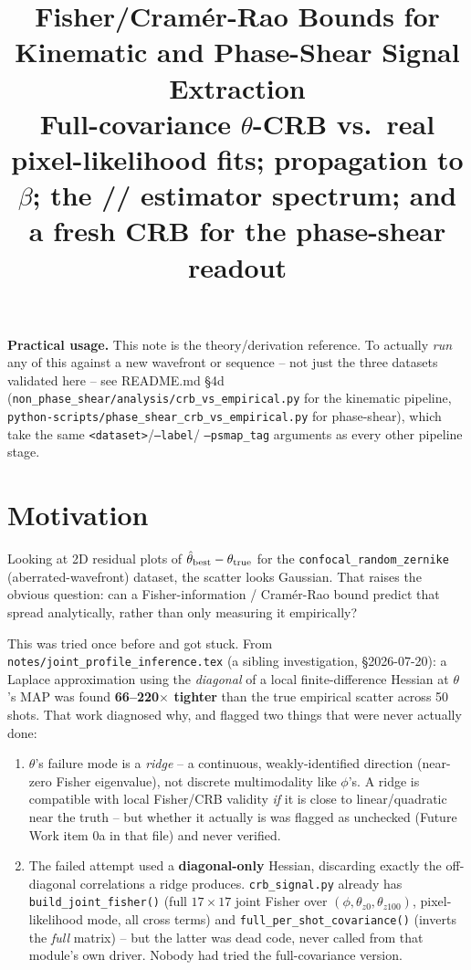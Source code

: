 \documentclass[11pt,a4paper]{article}
\title{%
  Fisher/Cram\'er-Rao Bounds for Kinematic and Phase-Shear Signal
  Extraction\\
  \large Full-covariance $\theta$-CRB vs.\ real pixel-likelihood fits;
  propagation to $\beta$; the \code{best}/\code{moments}/\code{null}
  estimator spectrum; and a fresh CRB for the phase-shear readout
}
\author{}
\date{}
\newcommand{\code}[1]{\texttt{#1}}
\begin{document}
\maketitle

\noindent\textbf{Practical usage.} This note is the theory/derivation
reference. To actually \emph{run} any of this against a new wavefront or
sequence -- not just the three datasets validated here -- see README.md
\S4d (\code{non\_phase\_shear/analysis/crb\_vs\_empirical.py} for the
kinematic pipeline, \code{python-scripts/phase\_shear\_crb\_vs\_empirical.py}
for phase-shear), which take the same \code{<dataset>}/\code{--label}/
\code{--psmap\_tag} arguments as every other pipeline stage.

\tableofcontents
\newpage

\section{Motivation}
\label{sec:motivation}

Looking at 2D residual plots of $\hat\theta_{\rm best}-\theta_{\rm true}$
for the \code{confocal\_random\_zernike} (aberrated-wavefront) dataset, the
scatter looks Gaussian. That raises the obvious question: can a
Fisher-information / Cram\'er-Rao bound predict that spread analytically,
rather than only measuring it empirically?

This was tried once before and got stuck. From
\code{notes/joint\_profile\_inference.tex} (a sibling investigation,
\S2026-07-20): a Laplace approximation using the \emph{diagonal} of a local
finite-difference Hessian at $\theta$'s MAP was found \textbf{66--220$\times$
tighter} than the true empirical scatter across 50 shots. That work diagnosed
why, and flagged two things that were never actually done:

\begin{enumerate}
  \item $\theta$'s failure mode is a \emph{ridge} -- a continuous,
    weakly-identified direction (near-zero Fisher eigenvalue), not discrete
    multimodality like $\phi$'s. A ridge is compatible with local Fisher/CRB
    validity \emph{if} it is close to linear/quadratic near the truth -- but
    whether it actually is was flagged as unchecked (Future Work item 0a in
    that file) and never verified.
  \item The failed attempt used a \textbf{diagonal-only} Hessian, discarding
    exactly the off-diagonal correlations a ridge produces. \code{crb\_signal.py}
    already has \code{build\_joint\_fisher()} (full $17\times17$ joint
    Fisher over $(\phi,\theta_{z0},\theta_{z100})$, pixel-likelihood mode,
    all cross terms) and \code{full\_per\_shot\_covariance()} (inverts the
    \emph{full} matrix) -- but the latter was dead code, never called from
    that module's own driver. Nobody had tried the full-covariance version.
\end{enumerate}
\end{document}
